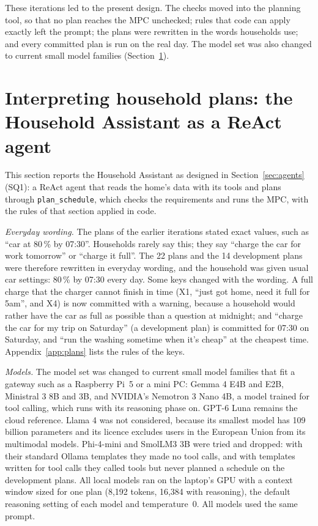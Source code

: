 \documentclass[12pt,a4paper]{report}
\begin{document}
These iterations led to the present design. The checks moved into the
planning tool, so that no plan reaches the MPC unchecked; rules that
code can apply exactly left the prompt; the plans were rewritten in the
words households use; and every committed plan is run on the real day.
The model set was also changed to current small model families
(Section~\ref{sec:reactpilot}).

\section{Interpreting household plans: the Household Assistant as a ReAct agent}
\label{sec:reactpilot}

This section reports the Household Assistant as designed in
Section~\ref{sec:agents} (SQ1): a ReAct agent that reads the home's
data with its tools and plans through \texttt{plan\_schedule}, which
checks the requirements and runs the MPC, with the rules of that
section applied in code.

\textit{Everyday wording.} The plans of the earlier iterations stated
exact values, such as ``car at 80\,\% by 07:30''. Households rarely say
this; they say ``charge the car for work tomorrow'' or ``charge it
full''. The 22 plans and the 14 development plans were therefore
rewritten in everyday wording, and the household was given usual car
settings: 80\,\% by 07:30 every day. Some keys changed with the
wording. A full charge that the charger cannot finish in time (X1,
``just got home, need it full for 5am'', and X4) is now committed with
a warning, because a household would rather have the car as full as
possible than a question at midnight; and ``charge the car for my trip
on Saturday'' (a development plan) is committed for 07:30 on Saturday,
and ``run the washing sometime when it's cheap'' at the cheapest time.
Appendix~\ref{app:plans} lists the rules of the keys.

\textit{Models.} The model set was changed to current small model
families that fit a gateway such as a Raspberry Pi~5 or a mini PC: Gemma 4 E4B
and E2B, Ministral 3 8B and 3B, and NVIDIA's Nemotron 3 Nano 4B, a
model trained for tool calling, which runs with its reasoning phase on.
GPT-6 Luna remains the cloud reference. Llama 4 was not considered,
because its smallest model has 109 billion parameters and its licence
excludes users in the European Union from its multimodal models.
Phi-4-mini and SmolLM3 3B were tried and dropped: with their standard
Ollama templates they made no tool calls, and with templates written
for tool calls they called tools but never planned a schedule on the
development plans. All local models ran on the laptop's GPU with a
context window sized for one plan (8,192 tokens, 16,384 with
reasoning), the default reasoning setting of each model and
temperature~0. All models used the same prompt.
\end{document}
